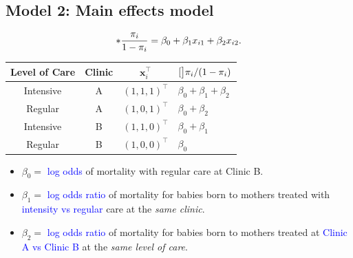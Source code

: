 \documentclass[oneside]{book}\usepackage[]{graphicx}\usepackage[svgnames]{xcolor}
\let\log\relax%
\providecommand{\Vector}[1]{\bm{#1}}%
\begin{document}
\subsection*{Model 2: Main effects model}
\[ \log*{\frac{\pi_i}{1-\pi_i}}=\beta_0+\beta_1x_{i1}+\beta_2x_{i2}. \]
\begin{table}[!htbp]
      \centering
      \begin{tabular}{cccl}
            Level of Care & Clinic & $ \Vector{x}_i^\top $ & $ \log[\big]{\pi_i/(1-\pi_i)} $ \\
            \midrule
            Intensive     & A      & $ (1,1,1)^\top $      & $ \beta_0+\beta_1+\beta_2 $     \\
            Regular       & A      & $ (1,0,1)^\top $      & $ \beta_0+\beta_2 $             \\
            Intensive     & B      & $ (1,1,0)^\top $      & $ \beta_0+\beta_1 $             \\
            Regular       & B      & $ (1,0,0)^\top $      & $ \beta_0 $                     \\
            \bottomrule
      \end{tabular}
\end{table}
\begin{itemize}
      \item $ \beta_0= $ \textcolor{Blue}{log odds} of mortality with regular care at Clinic B.
      \item $ \beta_1= $ \textcolor{Blue}{log odds ratio} of mortality for babies born to mothers treated with
            \textcolor{Blue}{intensity vs regular} care at the \emph{same clinic}.
      \item $ \beta_2= $ \textcolor{Blue}{log odds ratio} of mortality for babies born to mothers treated at
            \textcolor{Blue}{Clinic A vs Clinic B} at the \emph{same level of care}.
\end{itemize}
\end{document}

